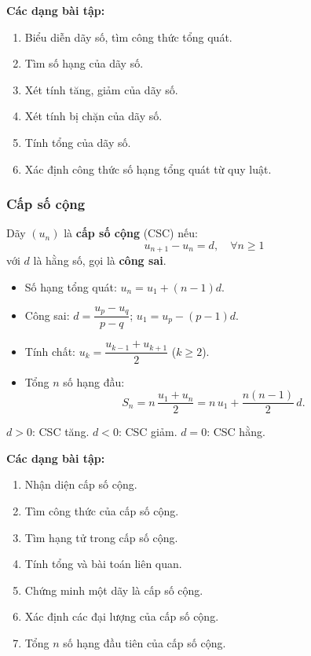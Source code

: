 \documentclass[12pt,a4paper]{article}
\begin{document}
\medskip\noindent\textbf{Các dạng bài tập:}
\begin{enumerate}[label=\textbf{Dạng \arabic*:}, leftmargin=*, align=left]
  \item Biểu diễn dãy số, tìm công thức tổng quát.
  \item Tìm số hạng của dãy số.
  \item Xét tính tăng, giảm của dãy số.
  \item Xét tính bị chặn của dãy số.
  \item Tính tổng của dãy số.
  \item Xác định công thức số hạng tổng quát từ quy luật.
\end{enumerate}

\subsubsection{Cấp số cộng}

\begin{dinhnghia}
  Dãy $(u_n)$ là \textbf{cấp số cộng} (CSC) nếu:
  \[
    u_{n+1} - u_n = d,\quad \forall n \ge 1
  \]
  với $d$ là hằng số, gọi là \textbf{công sai}.
\end{dinhnghia}

\begin{congthuc}
  \begin{itemize}
    \item Số hạng tổng quát: $u_n = u_1 + (n-1)d$.
    \item Công sai: $d = \dfrac{u_p - u_q}{p - q}$; \quad $u_1 = u_p - (p-1)d$.
    \item Tính chất: $u_k = \dfrac{u_{k-1} + u_{k+1}}{2}$ \;($k \ge 2$).
    \item Tổng $n$ số hạng đầu:
      \[
        S_n = n\,\dfrac{u_1 + u_n}{2}
            = n\,u_1 + \dfrac{n(n-1)}{2}\,d.
      \]
  \end{itemize}
\end{congthuc}

\begin{luuy}
  $d > 0$: CSC tăng. \quad $d < 0$: CSC giảm. \quad $d = 0$: CSC hằng.
\end{luuy}

\medskip\noindent\textbf{Các dạng bài tập:}
\begin{enumerate}[label=\textbf{Dạng \arabic*:}, leftmargin=*, align=left]
  \item Nhận diện cấp số cộng.
  \item Tìm công thức của cấp số cộng.
  \item Tìm hạng tử trong cấp số cộng.
  \item Tính tổng và bài toán liên quan.
  \item Chứng minh một dãy là cấp số cộng.
  \item Xác định các đại lượng của cấp số cộng.
  \item Tổng $n$ số hạng đầu tiên của cấp số cộng.
\end{enumerate}
\end{document}
